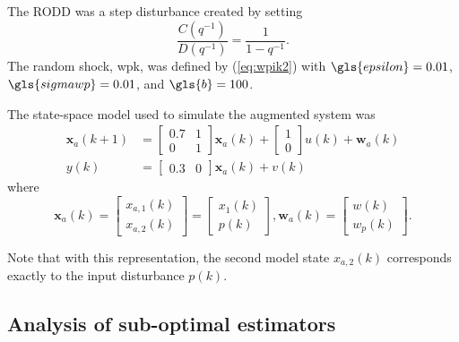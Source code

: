 The \gls{RODD} was a step disturbance created by setting
\begin{equation}
	\frac{C(q^{-1})}{D(q^{-1})} = \frac{1}{1-q^{-1}}.
\end{equation}
The random shock, \gls{wpk}, was defined by (\ref{eq:wpik2}) with $\gls{epsilon}=0.01$, $\gls{sigmawp}=0.01$, and $\gls{b}=100$.

The state-space model used to simulate the augmented system was
\begin{equation} \label{eq:sim-sys-siso-ss-aug}
	\begin{split}
	\mathbf{x}_{a}(k+1) & =\left[\begin{array}{cc}
		0.7 & 1 \\
		0 & 1
	\end{array}\right] \mathbf{x}_{a}(k)+\left[\begin{array}{l}
		1 \\
		0
	\end{array}\right] u(k) + \mathbf{w}_{a}(k) \\
	y(k) & =\left[\begin{array}{cc}
	0.3 & 0
\end{array}\right] \mathbf{x}_{a}(k) + v(k)
\end{split}
\end{equation}
where
\begin{equation} \label{eq:sim-sys-siso-ss-aug2}
		\mathbf{x}_{a}(k) = \left[\begin{array}{l}
			x_{a,1}(k) \\
			x_{a,2}(k)
		\end{array}\right] = \left[\begin{array}{l}
		x_{1}(k) \\
		p(k)
	\end{array}\right], \mathbf{w}_{a}(k) = \left[\begin{array}{l}
	w(k) \\
	w_{p}(k)
\end{array}\right] .
\end{equation}

Note that with this representation, the second model state $x_{a,2}(k)$ corresponds exactly to the input disturbance $p(k)$.

\subsection{Analysis of sub-optimal estimators} \label{sim-obs-lin-1-SKF-analysis}

